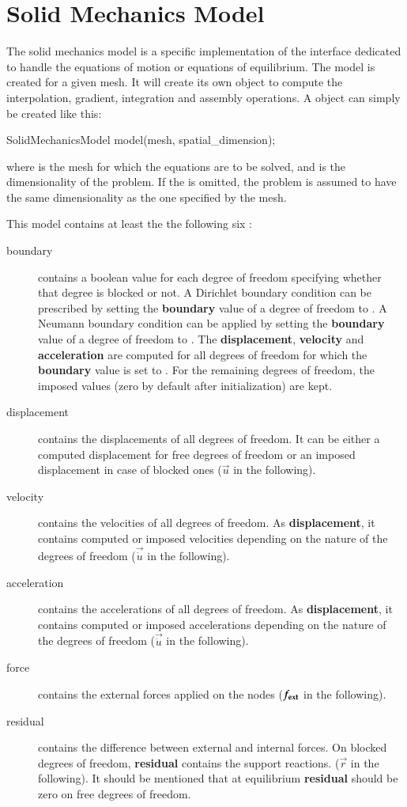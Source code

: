 \chapter{Solid Mechanics
Model\label{sect:smm}}

The solid mechanics model is a specific implementation of the
 interface dedicated to handle the equations of motion or
equations of equilibrium. The model is created for a given mesh.  It
will create its own  object to compute the interpolation,
gradient, integration and assembly operations.  A
 object can simply be created like this:
\begin{cpp} 
SolidMechanicsModel model(mesh, spatial_dimension);
\end{cpp} 
where  is the mesh for which the equations are to be
solved, and  is the dimensionality of the
problem.  If the  is omitted, the problem is
assumed to have the same dimensionality as the one specified by the
mesh.

This model contains at least the the following six :
\begin{description}
\item[boundary] contains a boolean value for each degree of freedom
  specifying whether that degree is blocked or not. A Dirichlet
  boundary condition can be prescribed by setting the
  \textbf{boundary} value of a degree of freedom to .  A
  Neumann boundary condition can be applied by setting the
  \textbf{boundary} value of a degree of freedom to .  The
  \textbf{displacement}, \textbf{velocity} and \textbf{acceleration}
  are computed for all degrees of freedom for which the
  \textbf{boundary} value is set to . For the remaining
  degrees of freedom, the imposed values (zero by default after
  initialization) are kept.
\item[displacement] contains the displacements of all degrees of
  freedom. It can be either a computed displacement for free degrees
  of freedom or an imposed displacement in case of blocked ones
  ($\vec{u}$ in the following).
\item[velocity] contains the velocities of all degrees of freedom.  As
  \textbf{displacement}, it contains computed or imposed velocities
  depending on the nature of the degrees of freedom ($\vec{\dot{u}}$
  in the following).
\item[acceleration] contains the accelerations of all degrees of
  freedom. As \textbf{displacement}, it contains computed or imposed
  accelerations depending on the nature of the degrees of freedom
  ($\vec{\ddot{u}}$ in the following).
\item[force] contains the external forces applied on the nodes
  ($\boldsymbol{f_{{\mathrm{ext}}}}$ in the following).
\item[residual] contains the difference between external and internal
  forces. On blocked degrees of freedom, \textbf{residual} contains
  the support reactions.  ($\vec{r}$ in the following).  It should be
  mentioned that at equilibrium \textbf{residual} should be zero on
  free degrees of freedom.
\end{description}

